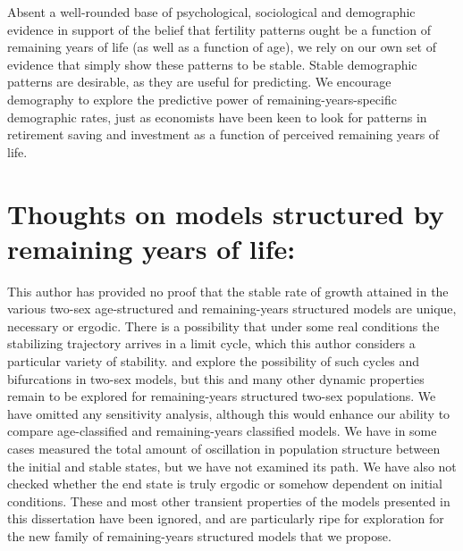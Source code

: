Absent a well-rounded base of psychological, sociological and demographic
evidence in support of the belief that fertility patterns ought be a function of
remaining years of life (as well as a function of age), we rely on our own
set of evidence that simply show these patterns to be stable. Stable demographic
patterns are desirable, as they are useful for predicting. We encourage
demography to explore the predictive power of remaining-years-specific
demographic rates, just as economists have been keen to look for patterns in
retirement saving and investment as a function of perceived remaining years of
life.

\section{Thoughts on models structured by remaining years of life: }
This author has provided no proof that the stable rate of growth
attained in the various two-sex age-structured and remaining-years structured
models are unique, necessary or ergodic. There is a possibility that under some
real conditions the stabilizing trajectory arrives in a limit cycle, which this
author considers a particular variety of stability. \citet{wijewickrema1980weak}
and \citet{chung1990phd, chung1994cycles} explore the possibility of such cycles
and bifurcations in two-sex models, but this and many other dynamic
properties remain to be explored for remaining-years structured two-sex
populations. We have omitted any sensitivity analysis, although this would
enhance our ability to compare age-classified and remaining-years
classified models. We have in some cases measured the total amount of
oscillation in population structure between the initial and stable states, but
we have not examined its path. We have also not checked whether the end state
is truly ergodic or somehow dependent on initial conditions. These and most
other transient properties of the models presented in this dissertation have
been ignored, and are particularly ripe for exploration for the new family of
remaining-years structured models that we propose.

